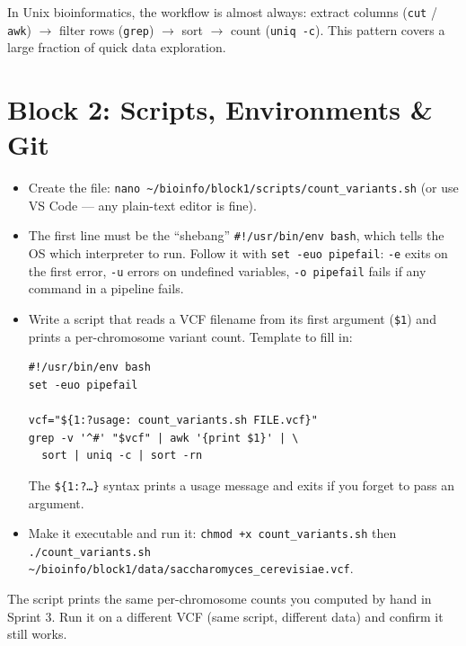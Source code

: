 \begin{tipbox}
In Unix bioinformatics, the workflow is almost always: extract columns (\texttt{cut} / \texttt{awk}) $\to$ filter rows (\texttt{grep}) $\to$ sort $\to$ count (\texttt{uniq -c}). This pattern covers a large fraction of quick data exploration.
\end{tipbox}


\section{Block 2: Scripts, Environments \& Git}

\begin{itemize}[nosep]
  \item Create the file: \texttt{nano \textasciitilde/bioinfo/block1/scripts/count\_variants.sh} (or use VS Code --- any plain-text editor is fine).
  \item The first line must be the ``shebang'' \texttt{\#!/usr/bin/env bash}, which tells the OS which interpreter to run. Follow it with \texttt{set -euo pipefail}: \texttt{-e} exits on the first error, \texttt{-u} errors on undefined variables, \texttt{-o pipefail} fails if any command in a pipeline fails.
  \item Write a script that reads a VCF filename from its first argument (\texttt{\$1}) and prints a per-chromosome variant count. Template to fill in:
    \begin{lstlisting}
#!/usr/bin/env bash
set -euo pipefail

vcf="${1:?usage: count_variants.sh FILE.vcf}"
grep -v '^#' "$vcf" | awk '{print $1}' | \
  sort | uniq -c | sort -rn
    \end{lstlisting}
    The \texttt{\$\{1:?\ldots\}} syntax prints a usage message and exits if you forget to pass an argument.
  \item Make it executable and run it: \texttt{chmod +x count\_variants.sh} then \texttt{./count\_variants.sh \textasciitilde/bioinfo/block1/data/saccharomyces\_cerevisiae.vcf}.
\end{itemize}
\begin{winbox}[Checkpoint]
The script prints the same per-chromosome counts you computed by hand in Sprint 3. Run it on a different VCF (same script, different data) and confirm it still works.
\end{winbox}

